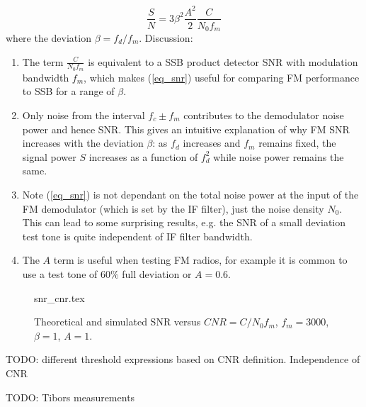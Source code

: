 \documentclass{article}
\begin{document}
\begin{equation}
\label{eq_snr}
\frac{S}{N} = 3 \beta^2 \frac{A^2}{2} \frac{C}{N_0 f_m}
\end{equation}
where the deviation $\beta=f_d/f_m$. Discussion:
\begin{enumerate}
\item The term $\frac{C}{N_0 f_m}$ is equivalent to a SSB product detector SNR with modulation bandwidth $f_m$, which makes (\ref{eq_snr}) useful for comparing FM performance to SSB for a range of $\beta$.
\item Only noise from the interval $f_c \pm f_m$ contributes to the demodulator noise power and hence SNR. This gives an intuitive explanation of why FM SNR increases with the deviation $\beta$: as $f_d$ increases and $f_m$ remains fixed, the signal power $S$ increases as a function of $f_d^2$ while noise power remains the same.
\item Note (\ref{eq_snr}) is not dependant on the total noise power at the input of the FM demodulator (which is set by the IF filter), just the noise density $N_0$.  This can lead to some surprising results, e.g. the SNR of a small deviation test tone is quite independent of IF filter bandwidth.
\item The $A$ term is useful when testing FM radios, for example it is common to use a test tone of 60\% full deviation or $A=0.6$.
\end{enumerate}

\begin{figure}[h]
\caption{Theoretical and simulated SNR versus $CNR=C/N_0f_m$, $f_m=3000$, $\beta=1$, $A=1$.}
\label{fig:fm_cnr_snr}
\begin{center}
 {snr_cnr.tex}
\end{center}
\end{figure}


TODO: different threshold expressions based on CNR definition. Independence of CNR

TODO: Tibors measurements



\end{document}

